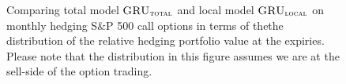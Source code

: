 \documentclass[letterpaper,12pt,titlepage,oneside,final]{book}
\numberwithin{equation}{section}
\theoremstyle{definition}
\newcommand{\modelT}{\textsc{GRU}_{\textsc{total}}}
\newcommand{\modelL}{\textsc{GRU}_{\textsc{local}}}
\begin{document}
\begin{figure}[htp!]
	\centering
	\caption{Comparing total model $\modelT$ and local model $\modelL$ on monthly hedging S\&P 500 call options in terms of thethe distribution of the  relative hedging portfolio value at the expiries. Please note that the distribution in this figure assumes we are at the sell-side of the option trading.} \label{fig:CallTotalM1}
		\centering

\end{figure}
\end{document}
